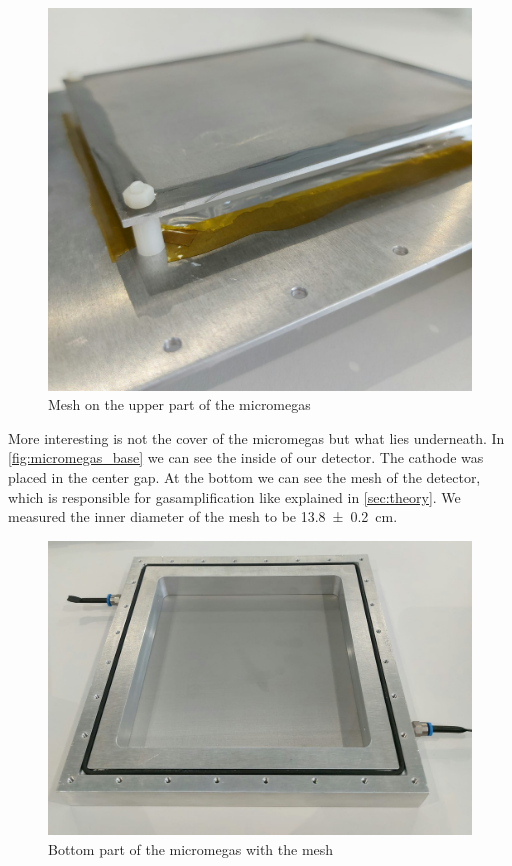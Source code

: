 \documentclass[sn-mathphys-num,iicol]{sn-jnl}
\theoremstyle{thmstyleone}
\theoremstyle{thmstyletwo}
\theoremstyle{thmstylethree}
\begin{document}
\begin{figure}
  \includegraphics[width=\linewidth]{figures/micromegas_cover.jpeg}
  \caption{Mesh on the upper part of the micromegas}
  \label{fig:micromegas_cover}
\end{figure}

More interesting is not the cover of the micromegas but what lies underneath.
In \autoref{fig:micromegas_base} we can see the inside of our detector. The cathode was placed in the center gap.
At the bottom we can see the mesh of the detector, which is responsible for gasamplification like explained in \autoref{sec:theory}.
We measured the inner diameter of the mesh to be \SI{13.8\pm.2}{\centi\meter}.

\begin{figure}
  \includegraphics[width=\linewidth]{figures/micromegas_base_top.jpeg}
  \caption{Bottom part of the micromegas with the mesh}
  \label{fig:micromegas_base}
\end{figure}
\end{document}
